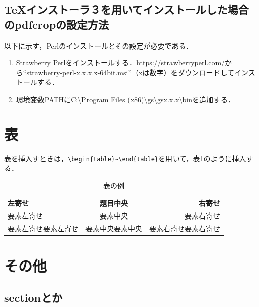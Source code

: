 \documentclass[11pt,a4paper]{jsarticle}
\begin{document}
\subsection{TeXインストーラ３を用いてインストールした場合のpdfcropの設定方法}\label{sec:pdfcrop-with-texinstaller3}

以下に示す，Perlのインストールとその設定が必要である．
\begin{enumerate}
  \item Strawberry Perlをインストールする．\url{https://strawberryperl.com/}から``strawberry-perl-x.x.x.x-64bit.msi''（xは数字）をダウンロードしてインストールする．
  \item 環境変数PATHに\url{C:\Program Files (x86)\gs\gsx.x.x\bin}を追加する．
\end{enumerate}

\section{表}

表を挿入すときは，\verb|\begin{table}~\end{table}|を用いて，表\ref{tab:example-table}のように挿入する．

\begin{table}[htb]
  \centering %
  \caption{表の例} %
  \label{tab:example-table} %
  \begin{tabular}{lc|r} %
    左寄せ               & 題目中央         & 右寄せ               \\
    \hline %
    要素左寄せ           & 要素中央         & 要素右寄せ           \\
    要素左寄せ要素左寄せ & 要素中央要素中央 & 要素右寄せ要素右寄せ \\
  \end{tabular}
\end{table}

\section{その他}

\subsection{sectionとか}
\end{document}

